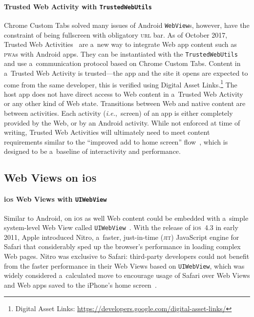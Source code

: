 \documentclass[sigconf,hyphens]{acmart}
\begin{document}
\paragraph{Trusted Web Activity with \texttt{TrustedWebUtils}}

Chrome Custom Tabs solved many issues of Android \texttt{WebView}s,
however, have the constraint of being fullscreen with obligatory \textsc{url} bar.
As of October 2017, Trusted Web Activities~\cite{googledevelopers2017twa} are a~new way to
integrate Web app content such as \textsc{pwa}s with Android apps.
They can be instantiated with the \texttt{TrustedWebUtils}
and use a~communication protocol based on Chrome Custom Tabs.
Content in a~Trusted Web Activity is trusted---the app and the site it opens
are expected to come from the same developer, this is verified using Digital Asset
Links.\footnote{Digital Asset Links:
\url{https://developers.google.com/digital-asset-links/}}
The host app does not have direct access to Web content in a~Trusted Web Activity
or any other kind of Web state.
Transitions between Web and native content are between activities.
Each activity (\emph{i.e.},\ screen) of an app is either completely provided by the Web,
or by an Android activity.
While not enforced at time of writing, Trusted Web Activities
will ultimately need to meet content requirements
similar to the ``improved add to home screen'' flow~\cite{kinlan2017a2hs},
which is designed to be a~baseline of interactivity and performance.

\subsection{Web Views on i\textsc{os}}

\paragraph{i\textsc{os} Web Views with \texttt{UIWebView}}

Similar to Android, on i\textsc{os} as well Web content could be embedded with
a~simple system-level Web View called \texttt{UIWebView}~\cite{apple2018uiwebview}.
With the release of i\textsc{os}~4.3 in early 2011, Apple introduced Nitro,
a~faster, just-in-time (\textsc{jit}) JavaScript engine for Safari
that considerably sped up the browser's performance in loading complex Web pages.
Nitro was exclusive to Safari: third-party developers could not benefit
from the faster performance in their Web Views based on \texttt{UIWebView},
which was widely considered a~calculated move to encourage usage of Safari
over Web Views and Web apps saved to the iPhone's home screen~\cite{viticci2015safari}.
\end{document}
